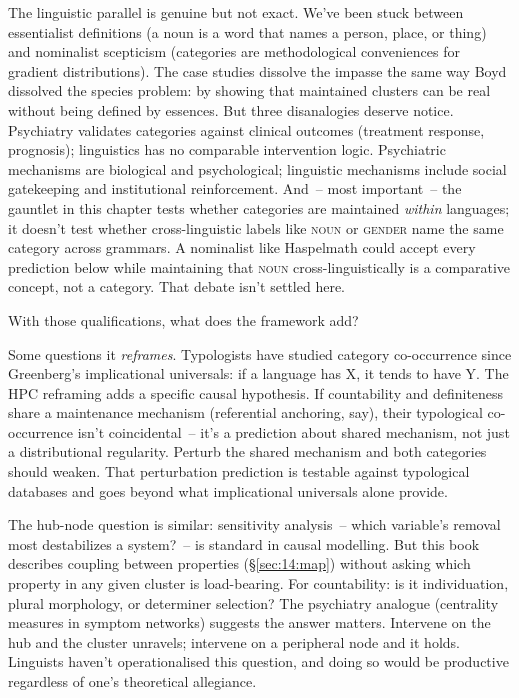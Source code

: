 The linguistic parallel is genuine but not exact. We've been stuck between essentialist definitions (a noun is a word that names a person, place, or thing) and nominalist scepticism (categories are methodological conveniences for gradient distributions). The case studies dissolve the impasse the same way Boyd dissolved the species problem: by showing that maintained clusters can be real without being defined by essences. But three disanalogies deserve notice. Psychiatry validates categories against clinical outcomes (treatment response, prognosis); linguistics has no comparable intervention logic. Psychiatric mechanisms are biological and psychological; linguistic mechanisms include social gatekeeping and institutional reinforcement. And~-- most important~-- the gauntlet in this chapter tests whether categories are maintained \emph{within} languages; it doesn't test whether cross-linguistic labels like \textsc{noun} or \textsc{gender} name the same category across grammars. A nominalist like Haspelmath could accept every prediction below while maintaining that \textsc{noun} cross-linguistically is a comparative concept, not a category. That debate isn't settled here.

With those qualifications, what does the framework add?

Some questions it \emph{reframes}. Typologists have studied category co-occurrence since Greenberg's implicational universals: if a language has X, it tends to have Y. The HPC reframing adds a specific causal hypothesis. If countability and definiteness share a maintenance mechanism (referential anchoring, say), their typological co-occurrence isn't coincidental~-- it's a prediction about shared mechanism, not just a distributional regularity. Perturb the shared mechanism and both categories should weaken. That perturbation prediction is testable against typological databases and goes beyond what implicational universals alone provide.

The hub-node question is similar: sensitivity analysis~-- which variable's removal most destabilizes a system?~-- is standard in causal modelling. But this book describes coupling between properties (§\ref{sec:14:map}) without asking which property in any given cluster is load-bearing. For countability: is it individuation, plural morphology, or determiner selection? The psychiatry analogue (centrality measures in symptom networks) suggests the answer matters. Intervene on the hub and the cluster unravels; intervene on a peripheral node and it holds. Linguists haven't operationalised this question, and doing so would be productive regardless of one's theoretical allegiance.

